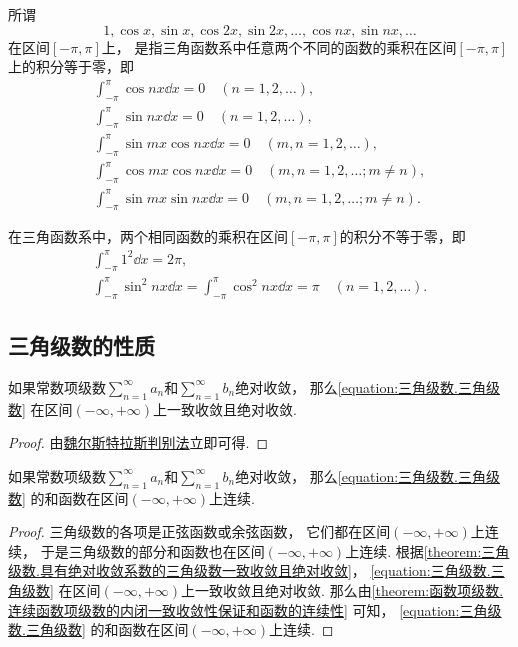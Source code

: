 \begin{definition}
所谓\[
1, \cos x, \sin x, \cos 2x, \sin 2x, \dotsc, \cos nx, \sin nx, \dotsc
\]在区间\([-\pi,\pi]\)上，
是指三角函数系中任意两个不同的函数的乘积在区间\([-\pi,\pi]\)上的积分等于零，即
\begin{gather*}
	\int_{-\pi}^\pi \cos{nx} \dd{x} = 0 \quad(n=1,2,\dotsc), \\
	\int_{-\pi}^\pi \sin{nx} \dd{x} = 0 \quad(n=1,2,\dotsc), \\
	\int_{-\pi}^\pi \sin{mx}\cos{nx} \dd{x} = 0 \quad(m,n=1,2,\dotsc), \\
	\int_{-\pi}^\pi \cos{mx}\cos{nx} \dd{x} = 0 \quad(m,n=1,2,\dotsc; m \neq n), \\
	\int_{-\pi}^\pi \sin{mx}\sin{nx} \dd{x} = 0 \quad(m,n=1,2,\dotsc; m \neq n).
\end{gather*}

在三角函数系中，两个相同函数的乘积在区间\([-\pi,\pi]\)的积分不等于零，即
\begin{gather*}
\int_{-\pi}^\pi 1^2 \dd{x} = 2\pi, \\
\int_{-\pi}^\pi \sin^2 nx \dd{x} = \int_{-\pi}^\pi \cos^2 nx \dd{x} = \pi \quad(n=1,2,\dotsc).
\end{gather*}
\end{definition}

\subsection{三角级数的性质}
\begin{property}\label{theorem:三角级数.具有绝对收敛系数的三角级数一致收敛且绝对收敛}
如果常数项级数\(\sum_{n=1}^\infty a_n\)和\(\sum_{n=1}^\infty b_n\)绝对收敛，
那么\cref{equation:三角级数.三角级数} 在区间\((-\infty,+\infty)\)上一致收敛且绝对收敛.
\begin{proof}
由\hyperref[theorem:无穷级数.魏尔斯特拉斯判别法]{魏尔斯特拉斯判别法}立即可得.
\end{proof}
\end{property}

\begin{property}
如果常数项级数\(\sum_{n=1}^\infty a_n\)和\(\sum_{n=1}^\infty b_n\)绝对收敛，
那么\cref{equation:三角级数.三角级数} 的和函数在区间\((-\infty,+\infty)\)上连续.
\begin{proof}
三角级数的各项是正弦函数或余弦函数，
它们都在区间\((-\infty,+\infty)\)上连续，
于是三角级数的部分和函数也在区间\((-\infty,+\infty)\)上连续.
根据\cref{theorem:三角级数.具有绝对收敛系数的三角级数一致收敛且绝对收敛}，
\cref{equation:三角级数.三角级数} 在区间\((-\infty,+\infty)\)上一致收敛且绝对收敛.
那么由\cref{theorem:函数项级数.连续函数项级数的内闭一致收敛性保证和函数的连续性} 可知，
\cref{equation:三角级数.三角级数} 的和函数在区间\((-\infty,+\infty)\)上连续.
\end{proof}
\end{property}


